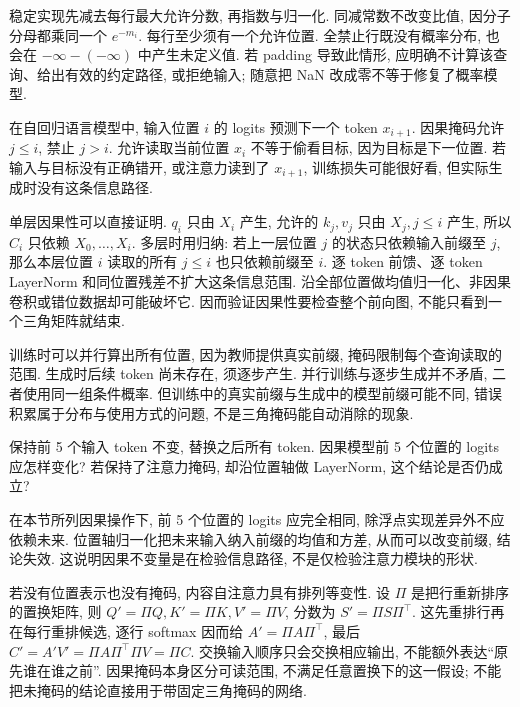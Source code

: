 稳定实现先减去每行最大允许分数, 再指数与归一化. 同减常数不改变比值, 因分子分母都乘同一个 $e^{-m_i}$. 每行至少须有一个允许位置. 全禁止行既没有概率分布, 也会在 $-\infty-(-\infty)$ 中产生未定义值. 若 padding 导致此情形, 应明确不计算该查询、给出有效的约定路径, 或拒绝输入; 随意把 NaN 改成零不等于修复了概率模型.

在自回归语言模型中, 输入位置 $i$ 的 logits 预测下一个 token $x_{i+1}$. 因果掩码允许 $j\le i$, 禁止 $j>i$. 允许读取当前位置 $x_i$ 不等于偷看目标, 因为目标是下一位置. 若输入与目标没有正确错开, 或注意力读到了 $x_{i+1}$, 训练损失可能很好看, 但实际生成时没有这条信息路径.

单层因果性可以直接证明. $q_i$ 只由 $X_i$ 产生, 允许的 $k_j,v_j$ 只由 $X_j,j\le i$ 产生, 所以 $C_i$ 只依赖 $X_0,\ldots,X_i$. 多层时用归纳: 若上一层位置 $j$ 的状态只依赖输入前缀至 $j$, 那么本层位置 $i$ 读取的所有 $j\le i$ 也只依赖前缀至 $i$. 逐 token 前馈、逐 token LayerNorm 和同位置残差不扩大这条信息范围. 沿全部位置做均值归一化、非因果卷积或错位数据却可能破坏它. 因而验证因果性要检查整个前向图, 不能只看到一个三角矩阵就结束.

训练时可以并行算出所有位置, 因为教师提供真实前缀, 掩码限制每个查询读取的范围. 生成时后续 token 尚未存在, 须逐步产生. 并行训练与逐步生成并不矛盾, 二者使用同一组条件概率. 但训练中的真实前缀与生成中的模型前缀可能不同, 错误积累属于分布与使用方式的问题, 不是三角掩码能自动消除的现象.

\begin{exercise}
保持前 5 个输入 token 不变, 替换之后所有 token. 因果模型前 5 个位置的 logits 应怎样变化? 若保持了注意力掩码, 却沿位置轴做 LayerNorm, 这个结论是否仍成立?
\end{exercise}
\begin{solution}
在本节所列因果操作下, 前 5 个位置的 logits 应完全相同, 除浮点实现差异外不应依赖未来. 位置轴归一化把未来输入纳入前缀的均值和方差, 从而可以改变前缀, 结论失效. 这说明因果不变量是在检验信息路径, 不是仅检验注意力模块的形状.
\end{solution}

若没有位置表示也没有掩码, 内容自注意力具有排列等变性. 设 $\Pi$ 是把行重新排序的置换矩阵, 则 $Q'=\Pi Q,K'=\Pi K,V'=\Pi V$, 分数为 $S'=\Pi S\Pi^\top$. 这先重排行再在每行重排候选, 逐行 softmax 因而给 $A'=\Pi A\Pi^\top$, 最后
$C'=A'V'=\Pi A\Pi^\top\Pi V=\Pi C$.
交换输入顺序只会交换相应输出, 不能额外表达“原先谁在谁之前”. 因果掩码本身区分可读范围, 不满足任意置换下的这一假设; 不能把未掩码的结论直接用于带固定三角掩码的网络.

